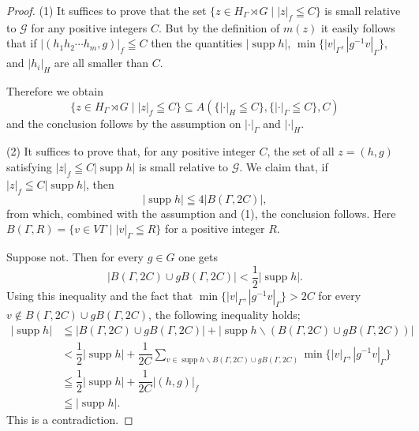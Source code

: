 \documentclass{amsart}
\theoremstyle{definition}
\renewcommand{\subset}{\subseteq}
\begin{document}
\begin{proof}
(1) It suffices to prove that the set $\{ z\in H_{\Gamma}\rtimes G \mid |z|_f\leqq C\}$
is small relative to $\mathcal{G}$ for any positive integers $C$. 
But by the definition of $m(z)$ it easily follows that if $|(h_1h_2\cdots h_m, g)|_f\leqq C$ then the quantities $|\mathop{supp}h|$, $\min\{ |v|_{\Gamma}, |g^{-1}v|_{\Gamma}\}$, and $|h_i|_H$ are all smaller than $C$. 

Therefore we obtain
\[
\{ z\in H_{\Gamma}\rtimes G \mid |z|_f\leqq C\} \subset
A(\{ |\cdot |_H\leqq C\}, \{ |\cdot |_{\Gamma}\leqq C\}, C )
\]
and the conclusion follows by the assumption on $|\cdot|_{\Gamma}$ and $|\cdot|_H$. 

(2) It suffices to prove that, for any positive integer $C$, the set of all $z=(h,g)$ satisfying $|z|_f\leqq C |\mathop{supp} h|$ is small relative to $\mathcal{G}$. 
We claim that, if $|z|_f\leqq C |\mathop{supp} h|$, then
\[
|\mathop{supp} h| \leqq 4 |B(\Gamma,2C)|,
\] 
from which, combined with the assumption and (1), the conclusion follows. 
Here $B(\Gamma,R)=\{v\in V\Gamma \mid |v|_{\Gamma} \leqq R\}$ for a positive integer $R$. 

Suppose not. Then for every $g\in G$ one gets
\[
|B(\Gamma, 2C)\cup gB(\Gamma,2C)|< \dfrac{1}{2}|\mathop{supp}h|. 
\]
Using this inequality and the fact that $\min\{ |v|_{\Gamma}, |g^{-1}v|_{\Gamma}\}>2C$ for every $v\notin B(\Gamma, 2C)\cup gB(\Gamma,2C)$, the following inequality holds;
\begin{align}
|\mathop{supp}h| 
&\leqq |B(\Gamma, 2C)\cup gB(\Gamma,2C) | + |\mathop{supp}h \backslash (B(\Gamma, 2C)\cup gB(\Gamma,2C))| \\
&< \dfrac{1}{2}|\mathop{supp}h| + \dfrac{1}{2C}\sum_{v\in \mathop{supp}h \backslash B(\Gamma, 2C)\cup gB(\Gamma,2C)} \min\{ |v|_{\Gamma}, |g^{-1}v|_{\Gamma}\}\\
&\leqq \dfrac{1}{2}|\mathop{supp}h| + \dfrac{1}{2C}|(h,g)|_f \\
&\leqq |\mathop{supp}h|. 
\end{align}
This is a contradiction. 



\end{proof}
\end{document}

